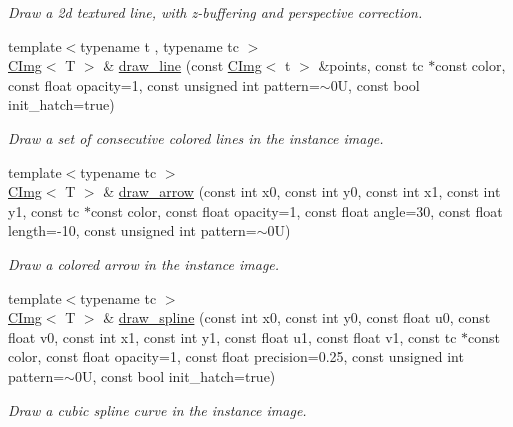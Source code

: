 \begin{DoxyCompactItemize}
\begin{DoxyCompactList}\small\item\em Draw a 2d textured line, with z-\/buffering and perspective correction. \item\end{DoxyCompactList}\item 
{\footnotesize template$<$typename t , typename tc $>$ }\\\hyperlink{structcimg__library_1_1CImg}{CImg}$<$ T $>$ \& \hyperlink{structcimg__library_1_1CImg_af42f741d0f579a78f9f58d0d6499bc53}{draw\_\-line} (const \hyperlink{structcimg__library_1_1CImg}{CImg}$<$ t $>$ \&points, const tc $\ast$const color, const float opacity=1, const unsigned int pattern=$\sim$0U, const bool init\_\-hatch=true)
\begin{DoxyCompactList}\small\item\em Draw a set of consecutive colored lines in the instance image. \item\end{DoxyCompactList}\item 
{\footnotesize template$<$typename tc $>$ }\\\hyperlink{structcimg__library_1_1CImg}{CImg}$<$ T $>$ \& \hyperlink{structcimg__library_1_1CImg_a4955c7a5a132072f634ed9832b783f83}{draw\_\-arrow} (const int x0, const int y0, const int x1, const int y1, const tc $\ast$const color, const float opacity=1, const float angle=30, const float length=-\/10, const unsigned int pattern=$\sim$0U)
\begin{DoxyCompactList}\small\item\em Draw a colored arrow in the instance image. \item\end{DoxyCompactList}\item 
{\footnotesize template$<$typename tc $>$ }\\\hyperlink{structcimg__library_1_1CImg}{CImg}$<$ T $>$ \& \hyperlink{structcimg__library_1_1CImg_a2ff5e462fffb6048577ff02ac95431aa}{draw\_\-spline} (const int x0, const int y0, const float u0, const float v0, const int x1, const int y1, const float u1, const float v1, const tc $\ast$const color, const float opacity=1, const float precision=0.25, const unsigned int pattern=$\sim$0U, const bool init\_\-hatch=true)
\begin{DoxyCompactList}\small\item\em Draw a cubic spline curve in the instance image. \item\end{DoxyCompactList}\item 

\end{DoxyCompactItemize}
